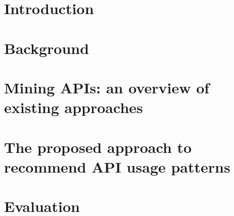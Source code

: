 \documentclass[
11pt, %
english, %
singlespacing, %
headsepline, %
]{MastersDoctoralThesis} %
\begin{document}
	
	
	
	
	
	
	\mainmatter %
	
	\pagestyle{thesis} %
	
	
	
	
	
	
	
	
	
	
	
	\chapter{Introduction}
	\label{sec:Introduction}
	
	
	
	
	\chapter{Background}
	\label{sec:Problemdefinition}
	
	
	
	\chapter{Mining APIs: an overview of existing approaches}
	\label{sec:RelatedWorks}
	
	
	
	
	
	\chapter{The proposed approach to recommend API usage patterns}
	\label{sec:MyApproach}
	
	
	
	\chapter{Evaluation}
	\label{sec:threats}
	
	
\end{document}
